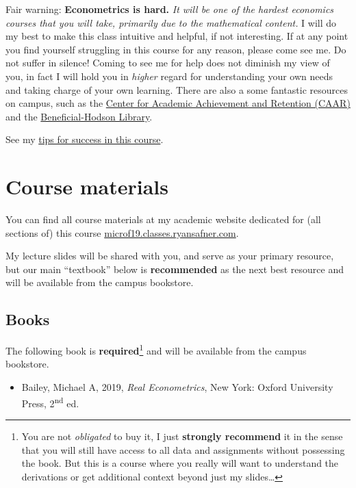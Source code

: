 \documentclass{article}
\providecommand{\tightlist}{%
  \setlength{\itemsep}{0pt}\setlength{\parskip}{0pt}}
\begin{document}
{Fair warning:} \textbf{Econometrics is hard.} \emph{It will be one of
the hardest economics courses that you will take, primarily due to the
mathematical content.} I will do my best to make this class intuitive
and helpful, if not interesting. If at any point you find yourself
struggling in this course for any reason, please come see me. Do not
suffer in silence! Coming to see me for help does not diminish my view
of you, in fact I will hold you in \emph{higher} regard for
understanding your own needs and taking charge of your own learning.
There are also a some fantastic resources on campus, such as the
\href{http://www.hood.edu/campus-services/academic-services/index.html}{Center
for Academic Achievement and Retention (CAAR)} and the
\href{http://www.hood.edu/library/\%7D\%7BBeneficial-Hodson\%20Library}{Beneficial-Hodson
Library}.

See my
\href{http://metricsf19.classes.ryansafner.com/reference\#tips}{tips for
success in this course}.

\hypertarget{course-materials}{%
\section{Course materials}\label{course-materials}}

You can find all course materials at my academic website dedicated for
(all sections of) this course
\href{http://microf19.classes.ryansafner.com}{microf19.classes.ryansafner.com}.

My lecture slides will be shared with you, and serve as your primary
resource, but our main ``textbook'' below is \textbf{recommended} as the
next best resource and will be available from the campus bookstore.

\hypertarget{books}{%
\subsection{Books}\label{books}}

The following book is \textbf{required}\footnote{You are not
  \emph{obligated} to buy it, I just \textbf{strongly recommend} it in
  the sense that you will still have access to all data and assignments
  without possessing the book. But this is a course where you really
  will want to understand the derivations or get additional context
  beyond just my slides\ldots{}} and will be available from the campus
bookstore.

\begin{itemize}
\tightlist
\item
  Bailey, Michael A, 2019, \emph{Real Econometrics}, New York: Oxford
  University Press, 2\textsuperscript{nd} ed.
\end{itemize}
\end{document}
